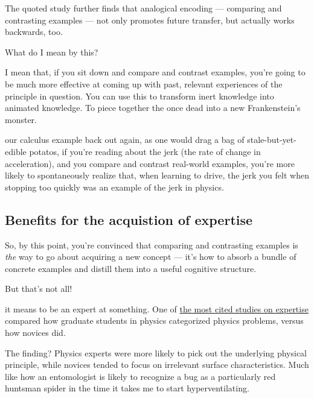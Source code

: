 The quoted study further finds that analogical encoding --- comparing and
contrasting examples --- not only promotes future transfer, but actually
works backwards, too.

What do I mean by this?

I mean that, if you sit down and compare and
contrast examples, you're going to be much more effective at coming up
with past, relevant experiences of the principle in question. You can
use this to transform inert knowledge into animated knowledge. To piece
together the once dead into a new Frankenstein's monster.

 our calculus example back out again, as one would drag a
bag of stale-but-yet-edible potatos, if you're reading about the jerk (the
rate of change in acceleration), and you compare and contrast real-world
examples, you're more likely to spontaneously realize that, when
learning to drive, the jerk you felt when stopping too quickly was an
example of the jerk in physics.

\subsection{Benefits for the acquistion of
expertise}\label{benefits-for-the-acquistion-of-expertise}

So, by this point, you're convinced that comparing and
contrasting examples is \emph{the} way to go about acquiring a new
concept --- it's how to absorb a bundle of concrete examples and distill
them into a useful cognitive structure.

But that's not all!

 it means
to be an expert at something. One of
\href{http://eric.ed.gov/?id=ED215899}{the most cited studies on
expertise} compared how graduate students in physics categorized physics
problems, versus how novices did.

The finding? Physics experts were more likely to pick out the underlying
physical principle, while novices tended to focus on irrelevant surface
characteristics. Much like how an entomologist is likely to recognize a bug as a
particularly red huntsman spider in the time it takes me to start
hyperventilating.


